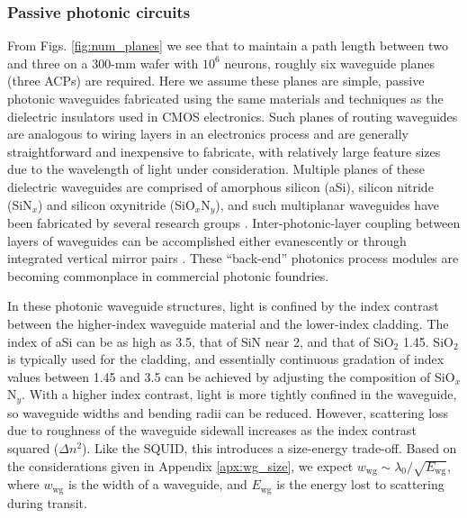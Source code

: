 \documentclass[twocolumn]{article}
\begin{document}
\subsubsection{Passive photonic circuits}
From Figs. \ref{fig:num_planes} we see that to maintain a path length between two and three on a 300-mm wafer with $10^6$ neurons, roughly six waveguide planes (three ACPs) are required. Here we assume these planes are simple, passive photonic waveguides fabricated using the same materials and techniques as the dielectric insulators used in CMOS electronics. Such planes of routing waveguides are analogous to wiring layers in an electronics process and are generally straightforward and inexpensive to fabricate, with relatively large feature sizes due to the wavelength of light under consideration. Multiple planes of these dielectric waveguides are comprised of amorphous silicon (aSi), silicon nitride (SiN$_x$) and silicon oxynitride (SiO$_x$N$_y$), and such multiplanar waveguides have been fabricated by several research groups \cite{shpa2015,sahu2015,chbu2017,zhli2018}. Inter-photonic-layer coupling between layers of waveguides can be accomplished either evanescently \cite{shpa2015,sahu2015,chbu2017} or through integrated vertical mirror pairs \cite{zhli2018}. These ``back-end'' photonics process modules are becoming commonplace in commercial photonic foundries. 

In these photonic waveguide structures, light is confined by the index contrast between the higher-index waveguide material and the lower-index cladding. The index of aSi can be as high as 3.5, that of SiN near 2, and that of SiO$_2$ 1.45. SiO$_2$ is typically used for the cladding, and essentially continuous gradation of index values between 1.45 and 3.5 can be achieved by adjusting the composition of SiO$_x$N$_y$. With a higher index contrast, light is more tightly confined in the waveguide, so waveguide widths and bending radii can be reduced. However, scattering loss due to roughness of the waveguide sidewall increases as the index contrast squared \cite{li2005} ($\Delta n^2$). Like the SQUID, this introduces a size-energy trade-off. Based on the considerations given in Appendix \ref{apx:wg_size}, we expect $w_{\mathrm{wg}} \sim \lambda_0/\sqrt{E_{\mathrm{wg}}}$, where $w_{\mathrm{wg}}$ is the width of a waveguide, and $E_{\mathrm{wg}}$ is the energy lost to scattering during transit. 
\end{document}
